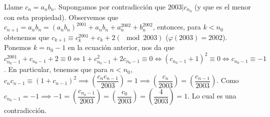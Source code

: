 \begin{sol}
	Llame $c_{n} = a_{n}b_{n}$. Supongamos por contradicci\'on que $2003|c_{n_{0}}$ (y que es el menor con esta propiedad). Observemos que $c_{n+1} = a_{n}b_{n} = \left(a_{n}b_{n}\right)^{2001} + a_{n}b_{n} + a_{n}^{2002}+b_{n}^{2002}$, entonces, para $k<n_{0}$ obtenemos que $c_{k+1} \equiv c_{k}^{2001}+c_{k} +2 (\mod 2003)$ ($\varphi(2003) = 2002$). Ponemos $k = n_{0}-1$ en la ecuaci\'on anterior, nos da que $c_{n_{0}-1}^{2001} +c_{n_{0}-1} + 2 \equiv 0 \iff 1+c_{n_{0}-1}^{2} + 2c_{n_{0}-1} \equiv 0 \iff (c_{n_{0}-1}+1)^{2} \equiv 0 \iff c_{n_{0}-1} \equiv -1$. En particular, tenemos que para $n< n_{0}$, $c_{n}c_{n-1} \equiv \left(1+c_{n-1}\right)^{2} \implies \left(\dfrac{c_{n}c_{n-1}}{2003}\right) = 1 \implies \left(\dfrac{c_{n}}{2003}\right) = \left(\dfrac{c_{n-1}}{2003}\right)$. Como $c_{n_{0}-1} = -1 \implies -1 = \left(\dfrac{c_{n_{0}-1}}{2003}\right) = \left(\dfrac{c_{0}}{2003}\right) = \left(\dfrac{4}{2003}\right) = 1$. Lo cual es una contradicci\'on.
\end{sol}
